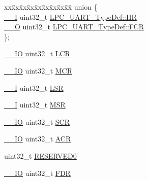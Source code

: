 \begin{DoxyCompactItemize}
\begin{tabbing}
\end{tabbing}\item 
\begin{tabbing}
xx\=xx\=xx\=xx\=xx\=xx\=xx\=xx\=xx\=\kill
union \{\\
\>\hyperlink{group___c_m_s_i_s__core__definitions_gaf63697ed9952cc71e1225efe205f6cd3}{\_\_I} uint32\_t \hyperlink{group___l_p_c11xx___definitions_ga360b5c67d6e31dd5f6a9c6f3ad57b8a0}{LPC\_UART\_TypeDef::IIR}\\
\>\hyperlink{group___c_m_s_i_s__core__definitions_ga7e25d9380f9ef903923964322e71f2f6}{\_\_O} uint32\_t \hyperlink{group___l_p_c11xx___definitions_ga397726038aebd15c8869a534e08e911b}{LPC\_UART\_TypeDef::FCR}\\
\}; \\

\end{tabbing}\item 
\hyperlink{group___c_m_s_i_s__core__definitions_gaec43007d9998a0a0e01faede4133d6be}{\+\_\+\+\_\+\+IO} uint32\+\_\+t \hyperlink{group___l_p_c11xx___definitions_gac260406af632c312e34268a20d63d9cf}{L\+CR}
\item 
\hyperlink{group___c_m_s_i_s__core__definitions_gaec43007d9998a0a0e01faede4133d6be}{\+\_\+\+\_\+\+IO} uint32\+\_\+t \hyperlink{group___l_p_c11xx___definitions_ga6643cdb94520e1a694777499964760a3}{M\+CR}
\item 
\hyperlink{group___c_m_s_i_s__core__definitions_gaf63697ed9952cc71e1225efe205f6cd3}{\+\_\+\+\_\+I} uint32\+\_\+t \hyperlink{group___l_p_c11xx___definitions_ga8a31a0104195ed9168c0d228802b5210}{L\+SR}
\item 
\hyperlink{group___c_m_s_i_s__core__definitions_gaf63697ed9952cc71e1225efe205f6cd3}{\+\_\+\+\_\+I} uint32\+\_\+t \hyperlink{group___l_p_c11xx___definitions_ga00bcf65497b984bf5b06ce6727d76161}{M\+SR}
\item 
\hyperlink{group___c_m_s_i_s__core__definitions_gaec43007d9998a0a0e01faede4133d6be}{\+\_\+\+\_\+\+IO} uint32\+\_\+t \hyperlink{group___l_p_c11xx___definitions_gae0fdb3089d0cd1e01f42c405fa93fc36}{S\+CR}
\item 
\hyperlink{group___c_m_s_i_s__core__definitions_gaec43007d9998a0a0e01faede4133d6be}{\+\_\+\+\_\+\+IO} uint32\+\_\+t \hyperlink{group___l_p_c11xx___definitions_ga7d5c974d92ad63ce7f5e212a7b4bfcd0}{A\+CR}
\item 
uint32\+\_\+t \hyperlink{group___l_p_c11xx___definitions_ga83e56087b281e86c37a25efd473bad96}{R\+E\+S\+E\+R\+V\+E\+D0}
\item 
\hyperlink{group___c_m_s_i_s__core__definitions_gaec43007d9998a0a0e01faede4133d6be}{\+\_\+\+\_\+\+IO} uint32\+\_\+t \hyperlink{group___l_p_c11xx___definitions_gabd85169bcb084d583ebd1b7bec5c06a8}{F\+DR}

\end{DoxyCompactItemize}
